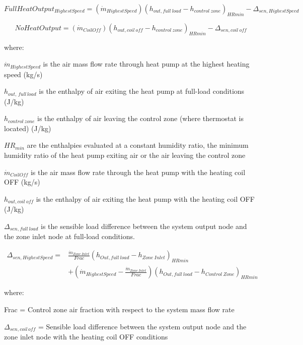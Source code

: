 \begin{equation}
FullHeatOutpu{t_{HighestSpeed}} = \left( {{{\dot m}_{HighestSpeed}}} \right){\left( {{h_{out,full~load}} - {h_{control~zone}}} \right)_{HRmin}} - {\Delta_{sen,HighestSpeed}}
\end{equation}

\begin{equation}
NoHeatOutput = \left( {{{\dot m}_{CoilOff}}} \right){\left( {{h_{out,coil~off}} - {h_{control~zone}}} \right)_{HRmin}} - {\Delta_{sen,coil~off}}
\end{equation}

where:

\({\dot m}_{HighestSpeed}\) is the air mass flow rate through heat pump at the highest heating speed (kg/s)

\(h_{out,\, full\, load}\) is the enthalpy of air exiting the heat pump at full-load conditions (J/kg)

\(h_{control~zone}\) is the enthalpy of air leaving the control zone (where thermostat is located) (J/kg)

\(HR_{min}\) are the enthalpies evaluated at a constant humidity ratio, the minimum humidity ratio of the heat pump exiting air or the air leaving the control zone

\({\dot m}_{CoilOff}\) is the air mass flow rate through the heat pump with the heating coil OFF (kg/s)

\(h_{out,coil~off}\) is the enthalpy of air exiting the heat pump with the heating coil OFF (J/kg)

\(\Delta_{sen,full~load}\) is the sensible load difference between the system output node and the zone inlet node at full-load conditions.

\begin{equation}
\begin{array}{rl}
{\Delta_{sen,HighestSpeed}} =& \frac{{{{\dot m}_{Zone~Inlet}}}}{{Frac}}{\left( {{h_{Out,full~load}} - {h_{Zone~Inlet}}} \right)_{HRmin}} \\
 & + \left( {{{\dot m}_{HighestSpeed}} - \frac{{{{\dot m}_{Zone~Inlet}}}}{{Frac}}} \right){\left( {h_{Out,full~load} - {h_{Control~Zone}}} \right)_{HRmin}}
\end{array}
\end{equation}

where:

Frac = Control zone air fraction with respect to the system mass flow rate

\(\Delta_{sen,coil\, off}\) = Sensible load difference between the system output node and the zone inlet node with the heating coil OFF conditions

